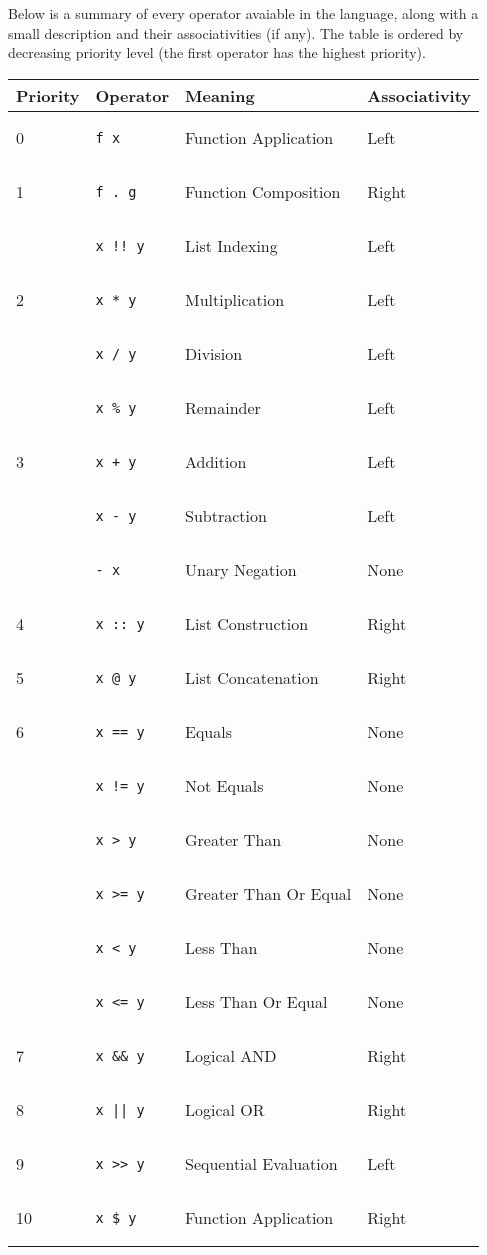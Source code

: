 \documentclass{article}
\def\code#1{\begin{footnotesize}\texttt{#1}\end{footnotesize}}
\begin{document}
Below is a summary of every operator avaiable in the language, along with a small description and their associativities (if any).
The table is ordered by decreasing priority level (the first operator has the highest priority).

\medskip

\begin{tabular}{|l|l|l|l|}
  \hline
  \textbf{Priority} & \textbf{Operator} & \textbf{Meaning} & \textbf{Associativity}\\
  \hline
  0 & \code{f x} & Function Application & Left\\
  \hline
  1 & \code{f . g} & Function Composition & Right\\
  \hline
   & \code{x !! y} & List Indexing & Left\\
  \hline
  2 & \code{x * y} & Multiplication & Left\\
  \hline
   & \code{x / y} & Division & Left\\
  \hline
   & \code{x \% y} & Remainder & Left\\
  \hline
  3 & \code{x + y} & Addition & Left\\
  \hline
   & \code{x - y} & Subtraction & Left\\
  \hline
   & \code{- x} & Unary Negation & None\\
  \hline
  4 & \code{x :: y} & List Construction & Right\\
  \hline
  5 & \code{x @ y} & List Concatenation & Right\\
  \hline
  6 & \code{x == y} & Equals & None\\
  \hline
   & \code{x != y} & Not Equals & None\\
  \hline
   & \code{x > y} & Greater Than & None\\
  \hline
   & \code{x >= y} & Greater Than Or Equal & None\\
  \hline
   & \code{x < y} & Less Than & None\\
  \hline
   & \code{x <= y} & Less Than Or Equal & None\\
  \hline
  7 & \code{x \&\& y} & Logical AND & Right\\
  \hline
  8 & \code{x || y} & Logical OR & Right\\
  \hline
  9 & \code{x >> y} & Sequential Evaluation & Left\\
  \hline
  10 & \code{x \$ y} & Function Application & Right\\
  \hline
\end{tabular}
\end{document}
